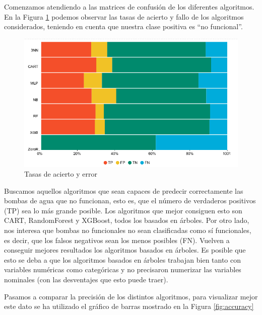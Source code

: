 \documentclass[a4paper, 20pt]{article}
\begin{document}
Comenzamos atendiendo a las matrices de confusión de los diferentes algoritmos. En la Figura \ref{fig:CM} podemos observar las tasas de acierto y fallo de los algoritmos considerados, teniendo en cuenta que nuestra clase positiva es ``no funcional''.

\begin{figure}[H]
    \centering
    \includegraphics[width=1\textwidth]{CM}
    \caption{Tasas de acierto y error}
    \label{fig:CM}
\end{figure}

Buscamos aquellos algoritmos que sean capaces de predecir correctamente las bombas de agua que no funcionan, esto es, que el número de verdaderos positivos (TP) sea lo más grande posible. Los algoritmos que mejor consiguen esto son CART, RandomForest y XGBoost, todos los basados en árboles. Por otro lado, nos interesa que bombas no funcionales no sean clasificadas como sí funcionales, es decir, que los falsos negativos sean los menos posibles (FN). Vuelven a conseguir mejores resultados los algoritmos basados en árboles. Es posible que esto se deba a que los algoritmos basados en árboles trabajan bien tanto con variables numéricas como categóricas y no precisaron numerizar las variables nominales (con las desventajes que esto puede traer).

Pasamos a comparar la precisión de los distintos algoritmos, para visualizar mejor este dato se ha utilizado el gráfico de barras mostrado en la Figura \ref{fig:accuracy}
\end{document}
